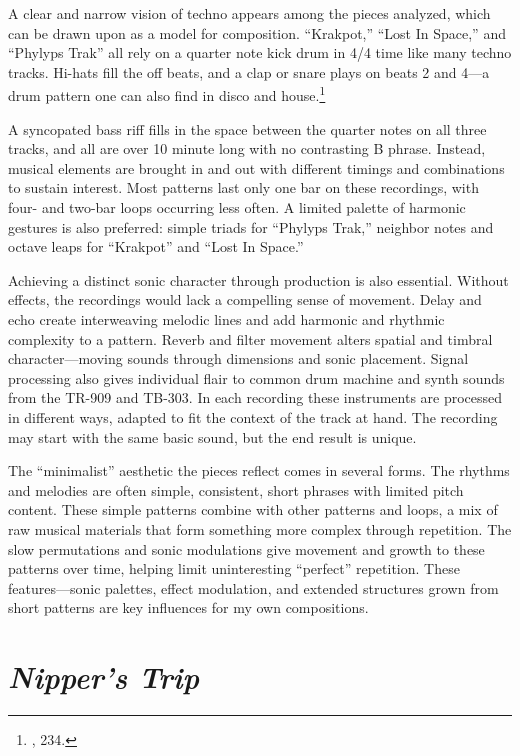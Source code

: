 \documentclass[12pt,twoside]{reedthesis}
\begin{document}
A clear and narrow vision of techno appears among the pieces analyzed, which can be drawn upon as a model for composition. ``Krakpot,'' ``Lost In Space,'' and ``Phylyps Trak'' all rely on a quarter note kick drum in 4/4 time like many techno tracks. Hi-hats fill the off beats, and a clap or snare plays on beats 2 and 4---a drum pattern one can also find in disco and house.\footnote{\cite{maloneyHouseMusicWas2018}, 234.}

A syncopated bass riff fills in the space between the quarter notes on all three tracks, and all are over 10 minute long with no contrasting B phrase. Instead, musical elements are brought in and out with different timings and combinations to sustain interest. Most patterns last only one bar on these recordings, with four- and two-bar loops occurring less often. A limited palette of harmonic gestures is also preferred: simple triads for ``Phylyps Trak,'' neighbor notes and octave leaps for ``Krakpot'' and ``Lost In Space.''

Achieving a distinct sonic character through production is also essential. Without effects, the recordings would lack a compelling sense of movement. Delay and echo create interweaving melodic lines and add harmonic and rhythmic complexity to a pattern. Reverb and filter movement alters spatial and timbral character---moving sounds through dimensions and sonic placement. Signal processing also gives individual flair to common drum machine and synth sounds from the TR-909 and TB-303. In each recording these instruments are processed in different ways, adapted to fit the context of the track at hand. The recording may start with the same basic sound, but the end result is unique.

The ``minimalist'' aesthetic the pieces reflect comes in several forms. The rhythms and melodies are often simple, consistent, short phrases with limited pitch content. These simple patterns combine with other patterns and loops, a mix of raw musical materials that form something more complex through repetition. The slow permutations and sonic modulations give movement and growth to these patterns over time, helping limit uninteresting ``perfect'' repetition. These features---sonic palettes, effect modulation, and extended structures grown from short patterns are key influences for my own compositions.

\chapter{\emph{Nipper's Trip}}
\end{document}
